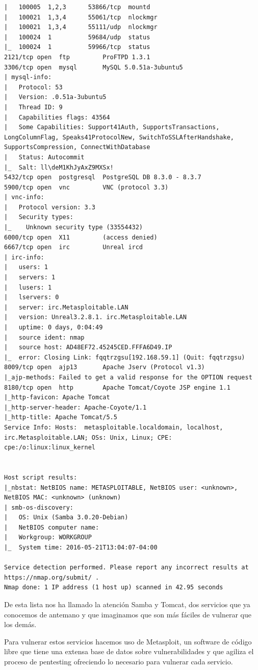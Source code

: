 \documentclass[a4paper,12pt]{scrartcl}
\begin{document}
\begin{lstlisting}[breaklines]
|   100005  1,2,3      53866/tcp  mountd
|   100021  1,3,4      55061/tcp  nlockmgr
|   100021  1,3,4      55111/udp  nlockmgr
|   100024  1          59684/udp  status
|_  100024  1          59966/tcp  status
2121/tcp open  ftp         ProFTPD 1.3.1
3306/tcp open  mysql       MySQL 5.0.51a-3ubuntu5
| mysql-info: 
|   Protocol: 53
|   Version: .0.51a-3ubuntu5
|   Thread ID: 9
|   Capabilities flags: 43564
|   Some Capabilities: Support41Auth, SupportsTransactions, LongColumnFlag, Speaks41ProtocolNew, SwitchToSSLAfterHandshake, SupportsCompression, ConnectWithDatabase
|   Status: Autocommit
|_  Salt: ll\deM1KhJyAxZ9MXSx!
5432/tcp open  postgresql  PostgreSQL DB 8.3.0 - 8.3.7
5900/tcp open  vnc         VNC (protocol 3.3)
| vnc-info: 
|   Protocol version: 3.3
|   Security types: 
|_    Unknown security type (33554432)
6000/tcp open  X11         (access denied)
6667/tcp open  irc         Unreal ircd
| irc-info: 
|   users: 1
|   servers: 1
|   lusers: 1
|   lservers: 0
|   server: irc.Metasploitable.LAN
|   version: Unreal3.2.8.1. irc.Metasploitable.LAN 
|   uptime: 0 days, 0:04:49
|   source ident: nmap
|   source host: AD48EF72.45245CED.FFFA6D49.IP
|_  error: Closing Link: fqqtrzgsu[192.168.59.1] (Quit: fqqtrzgsu)
8009/tcp open  ajp13       Apache Jserv (Protocol v1.3)
|_ajp-methods: Failed to get a valid response for the OPTION request
8180/tcp open  http        Apache Tomcat/Coyote JSP engine 1.1
|_http-favicon: Apache Tomcat
|_http-server-header: Apache-Coyote/1.1
|_http-title: Apache Tomcat/5.5
Service Info: Hosts:  metasploitable.localdomain, localhost, irc.Metasploitable.LAN; OSs: Unix, Linux; CPE: cpe:/o:linux:linux_kernel


Host script results:
|_nbstat: NetBIOS name: METASPLOITABLE, NetBIOS user: <unknown>, NetBIOS MAC: <unknown> (unknown)
| smb-os-discovery: 
|   OS: Unix (Samba 3.0.20-Debian)
|   NetBIOS computer name: 
|   Workgroup: WORKGROUP
|_  System time: 2016-05-21T13:04:07-04:00

Service detection performed. Please report any incorrect results at https://nmap.org/submit/ .
Nmap done: 1 IP address (1 host up) scanned in 42.95 seconds
\end{lstlisting}

De esta lista nos ha llamado la atención Samba y Tomcat, dos servicios que ya conocemos de antemano y que imaginamos que son más fáciles de vulnerar que los demás.

\vspace{10pt}

Para vulnerar estos servicios hacemos uso de Metasploit, un software de código libre que tiene una extensa base de datos sobre vulnerabilidades y que agiliza el proceso de pentesting ofreciendo lo necesario para vulnerar cada servicio\cite{metasploit}. 
\end{document}
